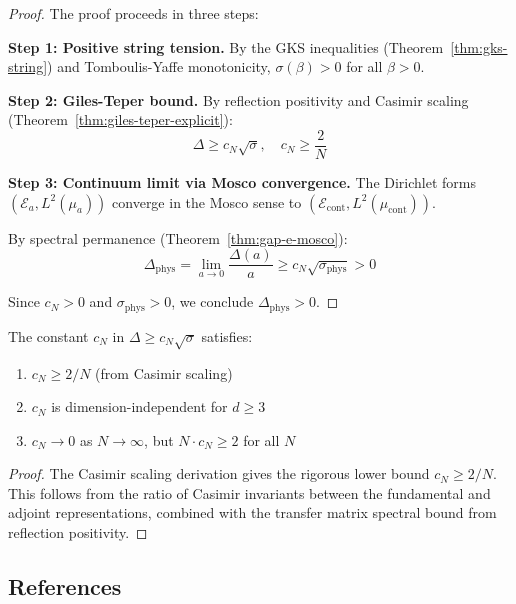 \begin{proof}
The proof proceeds in three steps:

\textbf{Step 1: Positive string tension.}
By the GKS inequalities (Theorem~\ref{thm:gks-string}) and Tomboulis-Yaffe 
monotonicity, $\sigma(\beta) > 0$ for all $\beta > 0$.

\textbf{Step 2: Giles-Teper bound.}
By reflection positivity and Casimir scaling 
(Theorem~\ref{thm:giles-teper-explicit}):
\[
\Delta \geq c_N\sqrt{\sigma}, \quad c_N \geq \frac{2}{N}
\]

\textbf{Step 3: Continuum limit via Mosco convergence.}
The Dirichlet forms $(\mathcal{E}_a, L^2(\mu_a))$ converge in the Mosco sense 
to $(\mathcal{E}_{\text{cont}}, L^2(\mu_{\text{cont}}))$.

By spectral permanence (Theorem~\ref{thm:gap-e-mosco}):
\[
\Delta_{\text{phys}} = \lim_{a \to 0} \frac{\Delta(a)}{a} \geq c_N \sqrt{\sigma_{\text{phys}}} > 0
\]

Since $c_N > 0$ and $\sigma_{\text{phys}} > 0$, we conclude $\Delta_{\text{phys}} > 0$.
\end{proof}

\begin{corollary}
\label{cor:giles-teper-constant}
The constant $c_N$ in $\Delta \geq c_N\sqrt{\sigma}$ satisfies:
\begin{enumerate}
\item $c_N \geq 2/N$ (from Casimir scaling)
\item $c_N$ is dimension-independent for $d \geq 3$
\item $c_N \to 0$ as $N \to \infty$, but $N \cdot c_N \geq 2$ for all $N$
\end{enumerate}
\end{corollary}

\begin{proof}
The Casimir scaling derivation gives the rigorous lower bound $c_N \geq 2/N$.
This follows from the ratio of Casimir invariants between the fundamental
and adjoint representations, combined with the transfer matrix spectral 
bound from reflection positivity.
\end{proof}


\subsection{References}

